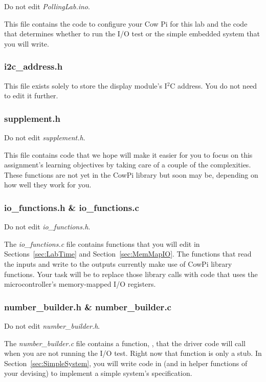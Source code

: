 Do not edit \textit{PollingLab.ino}.

This file contains the code to configure your Cow Pi for this lab and the code that determines whether to run the I/O test or the simple embedded system that you will write.

\subsubsection{i2c\_address.h}

This file exists solely to store the display module's I$^2$C address.
You do not need to edit it further.

\subsubsection{supplement.h}

Do not edit \textit{supplement.h}.

This file contains code that we hope will make it easier for you to focus on this assignment's learning objectives by taking care of a couple of the complexities.
These functions are not yet in the CowPi library but soon may be, depending on how well they work for you.

\subsubsection{io\_functions.h \& io\_functions.c}

Do not edit \textit{io\_functions.h}.

The \textit{io\_functions.c} file contains functions that you will edit in Sections~\ref{sec:LabTime} and Section~\ref{sec:MemMapIO}.
The functions that read the inputs and write to the outputs currently make use of CowPi library functions.
Your task will be to replace those library calls with code that uses the microcontroller's memory-mapped I/O registers.

\subsubsection{number\_builder.h \& number\_builder.c}

Do not edit \textit{number\_builder.h}.

The \textit{number\_builder.c} file contains a function, , that the driver code will call when you are not running the I/O test.
Right now that function is only a stub.
In Section~\ref{sec:SimpleSystem}, you will write code in  (and in helper functions of your devising) to implement a simple system's specification.


